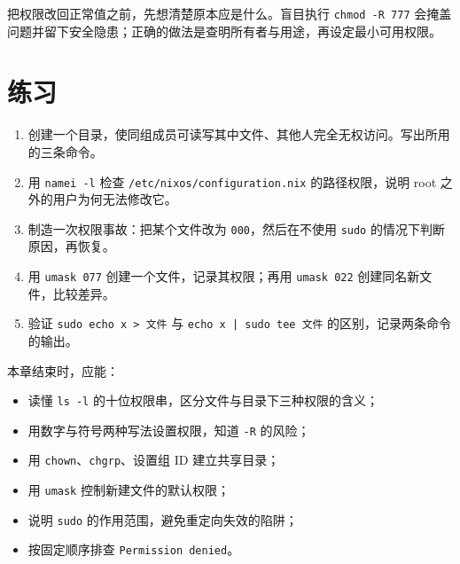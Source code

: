 把权限改回正常值之前，先想清楚原本应是什么。盲目执行 \texttt{chmod -R 777} 会掩盖问题并留下安全隐患；正确的做法是查明所有者与用途，再设定最小可用权限。

\section{练习}

\begin{enumerate}
  \item 创建一个目录，使同组成员可读写其中文件、其他人完全无权访问。写出所用的三条命令。
  \item 用 \texttt{namei -l} 检查 \texttt{/\allowbreak{}etc/\allowbreak{}nixos/\allowbreak{}configuration.\allowbreak{}nix} 的路径权限，说明 root 之外的用户为何无法修改它。
  \item 制造一次权限事故：把某个文件改为 \texttt{000}，然后在不使用 \texttt{sudo} 的情况下判断原因，再恢复。
  \item 用 \texttt{umask 077} 创建一个文件，记录其权限；再用 \texttt{umask 022} 创建同名新文件，比较差异。
  \item 验证 \texttt{sudo echo x > 文件} 与 \texttt{echo x | sudo tee 文件} 的区别，记录两条命令的输出。
\end{enumerate}

\begin{checkpoint}
本章结束时，应能：
\begin{itemize}
  \item 读懂 \texttt{ls -l} 的十位权限串，区分文件与目录下三种权限的含义；
  \item 用数字与符号两种写法设置权限，知道 \texttt{-R} 的风险；
  \item 用 \texttt{chown}、\texttt{chgrp}、设置组 ID 建立共享目录；
  \item 用 \texttt{umask} 控制新建文件的默认权限；
  \item 说明 \texttt{sudo} 的作用范围，避免重定向失效的陷阱；
  \item 按固定顺序排查 \texttt{Permission denied}。
\end{itemize}
\end{checkpoint}
